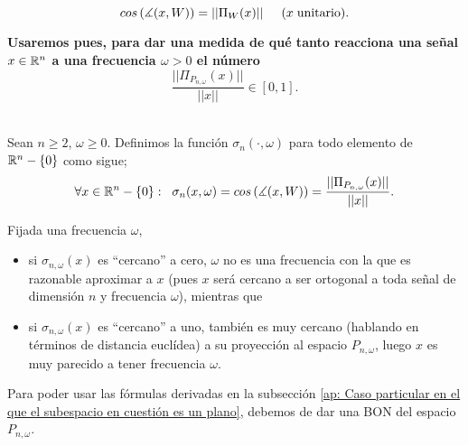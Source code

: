 \begin{equation}
\label{eq1: 20Mar}
cos \left( \measuredangle (x, W) \right) = || \Pi_{W}(x) || 
\hspace{0.5cm} (x \hspace{0.1cm} \text{unitario).}
\end{equation}


\textbf{Usaremos pues, para dar una medida de qué tanto
reacciona una señal $x \in \mathbb{R}^{n}$ a una frecuencia
$\omega >0$
el número 
\[\frac{||\Pi_{P_{n, \omega}}(x)||}{||x||} \in [0,1].\]} \\

\begin{defi}
\label{def: final de sigmas}
Sean $n \geq 2$, $\omega \geq 0$. 
Definimos la función $\sigma_{n}(\cdot, \omega)$ para todo 
elemento de $\mathbb{R}^{n} - \{ 0\}$
como sigue;
\begin{equation}
\label{eq: def sigmas}
	\forall x \in \mathbb{R}^{n}-\{ 0\}: \hspace{0.2cm}
	\sigma_{n}(x, \omega) =
	cos \left( \measuredangle (x, W) \right) = 
	\frac{||\Pi_{P_{n, \omega}}(x)||}{||x||} .
\end{equation}
\end{defi}

\begin{nota}
\label{nota: significado de los sigma en AE}
Fijada una frecuencia $\omega$, 
\begin{itemize}
\item si $\sigma_{n, \omega}(x)$ es ``cercano'' a cero, $\omega$ no
es una frecuencia con la que es razonable aproximar a $x$ (pues $x$ será
cercano a ser ortogonal a toda señal de dimensión $n$ y frecuencia 
$\omega$),  mientras que

\item si $\sigma_{n, \omega}(x)$ es ``cercano'' a uno, también es muy cercano
(hablando en términos de distancia euclídea) a su proyección al espacio
$P_{n, \omega}$, luego $x$ es muy parecido a tener frecuencia $\omega$.
\end{itemize}
\end{nota}



Para poder usar las fórmulas
derivadas en la subsección 
\ref{ap: Caso particular en el que el subespacio en cuestión es un plano},
debemos de dar una BON del espacio $P_{n, \omega}$.

